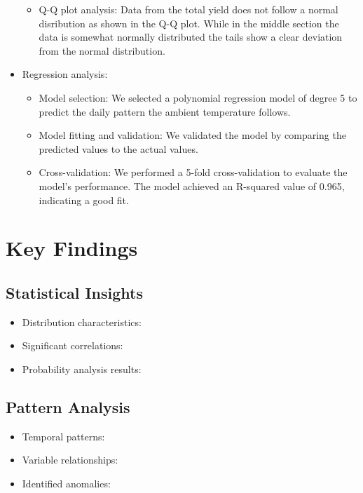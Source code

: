 \documentclass[10pt]{article}
\begin{document}
\begin{itemize}
    \begin{itemize}
        \item Q-Q plot analysis: Data from the total yield does not follow a normal disribution as shown in the Q-Q plot. While in the middle section the data is somewhat normally distributed the tails show a clear deviation from the normal distribution.
    \end{itemize}
    \item Regression analysis:
    \begin{itemize}
        \item Model selection: We selected a polynomial regression model of degree 5 to predict the daily pattern the ambient temperature follows.
        \item Model fitting and validation: We validated the model by comparing the predicted values to the actual values.
        \item Cross-validation: We performed a 5-fold cross-validation to evaluate the model's performance. The model achieved an R-squared value of 0.965, indicating a good fit.
    \end{itemize}
\end{itemize}

\section{Key Findings}

\subsection{Statistical Insights}
\begin{itemize}
    \item Distribution characteristics:
    \item Significant correlations:
    \item Probability analysis results:
\end{itemize}

\subsection{Pattern Analysis}
\begin{itemize}
    \item Temporal patterns:
    \item Variable relationships:
    \item Identified anomalies:
\end{itemize}
\end{document}
